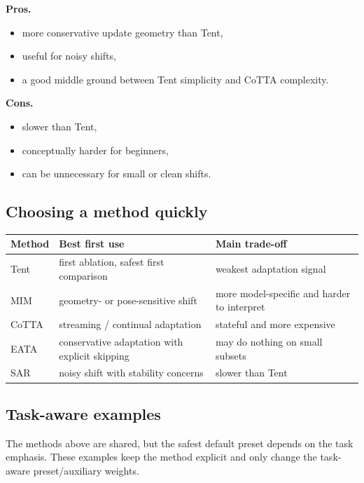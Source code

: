 \textbf{Pros.}
\begin{itemize}
  \item more conservative update geometry than Tent,
  \item useful for noisy shifts,
  \item a good middle ground between Tent simplicity and CoTTA complexity.
\end{itemize}

\textbf{Cons.}
\begin{itemize}
  \item slower than Tent,
  \item conceptually harder for beginners,
  \item can be unnecessary for small or clean shifts.
\end{itemize}

\subsection{Choosing a method quickly}
\begin{center}
\begin{tabular}{p{2.1cm} p{4.1cm} p{4.1cm}}
\toprule
\textbf{Method} & \textbf{Best first use} & \textbf{Main trade-off} \\
\midrule
Tent & first ablation, safest first comparison & weakest adaptation signal \\
MIM & geometry- or pose-sensitive shift & more model-specific and harder to interpret \\
CoTTA & streaming / continual adaptation & stateful and more expensive \\
EATA & conservative adaptation with explicit skipping & may do nothing on small subsets \\
SAR & noisy shift with stability concerns & slower than Tent \\
\bottomrule
\end{tabular}
\end{center}

\subsection{Task-aware examples}
The methods above are shared, but the safest default preset depends on the task emphasis.
These examples keep the method explicit and only change the task-aware preset/auxiliary weights.

